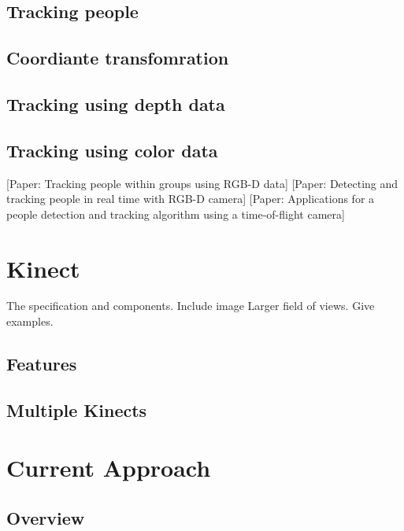 \documentclass{sigchi}
\begin{document}
\subsection{Tracking people}

\subsection{Coordiante transfomration}

\cite{wei_kinect_calibration}
\cite{eggert_four_algorithms}
\cite{horn_unit_quaternions}

\subsection{Tracking using depth data}

\subsection{Tracking using color data}

[Paper: Tracking people within groups using RGB-D data]
[Paper: Detecting and tracking people in real time with RGB-D camera]
[Paper: Applications for a people detection and tracking algorithm using a time-of-flight camera]

\section{Kinect}

The specification and components. Include image Larger field of views. Give examples.

\subsection{Features}

\subsection{Multiple Kinects}

\section{Current Approach}

\subsection{Overview}
\end{document}
